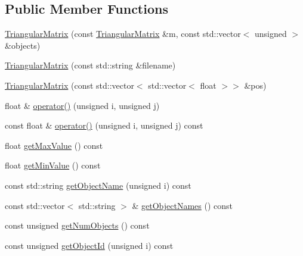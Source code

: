 \subsection*{Public Member Functions}
\begin{DoxyCompactItemize}
\item 
\hyperlink{classTriangularMatrix_ad36af401c342c0e6dd4ba6f11516869a}{Triangular\-Matrix} (const \hyperlink{classTriangularMatrix}{Triangular\-Matrix} \&m, const std\-::vector$<$ unsigned $>$ \&objects)
\item 
\hyperlink{classTriangularMatrix_a8f4116f20aed58d3710bc42bb5ff8d87}{Triangular\-Matrix} (const std\-::string \&filename)
\item 
\hyperlink{classTriangularMatrix_a6603e4d334209fba3aecfa080bec63e7}{Triangular\-Matrix} (const std\-::vector$<$ std\-::vector$<$ float $>$$>$ \&pos)
\item 
float \& \hyperlink{classTriangularMatrix_adba103bc50d20c4fd623ee0d00d94cc4}{operator()} (unsigned i, unsigned j)
\item 
const float \& \hyperlink{classTriangularMatrix_a61d203934af7655e8406b623326cf8e1}{operator()} (unsigned i, unsigned j) const 
\item 
float \hyperlink{classTriangularMatrix_a1f93bf63a6c6c09d5130ab3111aaab05}{get\-Max\-Value} () const 
\item 
float \hyperlink{classTriangularMatrix_adfcd136b2d1e437fe86eee93e8d5dcee}{get\-Min\-Value} () const 
\item 
const std\-::string \hyperlink{classTriangularMatrix_a13b74e86bd006c503c9a2958b2b93a3a}{get\-Object\-Name} (unsigned i) const 
\item 
const std\-::vector$<$ std\-::string $>$ \& \hyperlink{classTriangularMatrix_a8786092d7b7c58613b6e19384c7ebfcb}{get\-Object\-Names} () const 
\item 
const unsigned \hyperlink{classTriangularMatrix_a5040afab8fb04018c02dc2532401fab1}{get\-Num\-Objects} () const 
\item 
const unsigned \hyperlink{classTriangularMatrix_aced0b17dd812119356bc0a0e601b3fff}{get\-Object\-Id} (unsigned i) const 
\end{DoxyCompactItemize}



